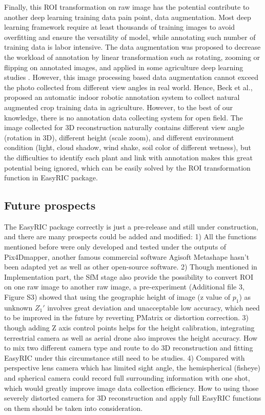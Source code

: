\documentclass{configs/bmcart}
\begin{document}
Finally, this ROI transformation on raw image has the potential contribute to another deep learning training data pain point, data augmentation. Most deep learning framework require at least thousands of training images to avoid overfitting and ensure the versatility of model, while annotating such number of training data is labor intensive. The data augmentation was proposed to decrease the workload of annotation by linear transformation such as rotating, zooming or flipping on annotated images, and applied in some agriculture deep learning studies \cite{han_real-time_2020, zhou_fast_2020}. However, this image processing based data augmentation cannot exceed the photo collected from different view angles in real world. Hence, Beck et al.,\cite{beck_embedded_2020} proposed an automatic indoor robotic annotation system to collect natural augmented crop training data in agriculture. However, to the best of our knowledge, there is no annotation data collecting system for open field. The image collected for 3D reconstruction naturally contains different view angle (rotation in 3D), different height (scale zoom), and different environment condition (light, cloud shadow, wind shake, soil color of different wetness), but the difficulties to identify each plant and link with annotation makes this great potential being ignored, which can be easily solved by the ROI transformation function in EasyRIC package.

\subsection*{Future prospects}
The EasyRIC package correctly is just a pre-release and still under construction, and there are many prospects could be added and modified: 1) All the functions mentioned before were only developed and tested under the outputs of Pix4Dmapper, another famous commercial software Agisoft Metashape hasn't been adapted yet as well as other open-source software. 2) Though mentioned in Implementation part, the SfM stage also provide the possibility to convert ROI on one raw image to another raw image, a pre-experiment (Additional file 3, Figure S3) showed that using the geographic height of image (z value of $p_1$) as unknown $Z_1'$ involves great deviation and unacceptable low accuracy, which need to be improved in the future by reverting PMatrix or distortion correction. 3) though adding Z axis control points helps for the height calibration, integrating terrestrial camera as well as aerial drone also improves the height accuracy. How to mix two different camera type and route to do 3D reconstruction and fitting EasyRIC under this circumstance still need to be studies. 4) Compared with perspective lens camera which has limited sight angle, the hemispherical (fisheye) and spherical camera could record full surrounding information with one shot, which would greatly improve image data collection efficiency. How to using those severely distorted camera for 3D reconstruction and apply full EasyRIC functions on them should be taken into consideration.
\end{document}
